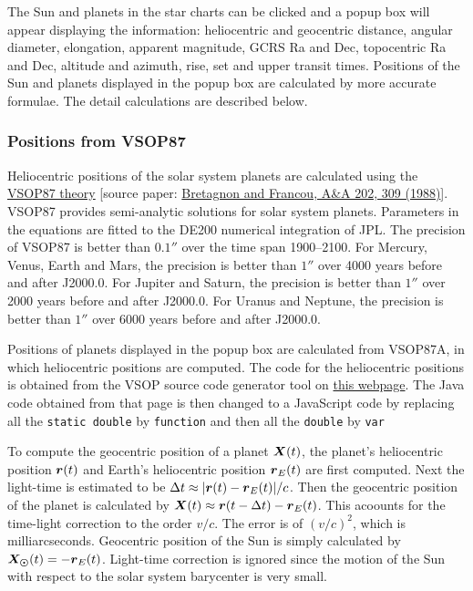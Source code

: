\documentclass[12pt]{article}
\newcommand{\ve}[1]{\mbox{\boldmath $#1$}}
\begin{document}
The Sun and planets in the star charts can be clicked and a popup box 
will appear displaying the information: heliocentric and geocentric distance, 
angular diameter, elongation, apparent magnitude, GCRS Ra and Dec, 
topocentric Ra and Dec, altitude and azimuth, rise, set and upper transit times. 
Positions of the Sun and planets displayed in the popup box are calculated by more 
accurate formulae. The detail calculations are described below.

\subsubsection{Positions from VSOP87} 

Heliocentric positions of the solar system planets are calculated using the 
\href{http://neoprogrammics.com/vsop87/}{VSOP87 theory} [source
paper: \href{https://ui.adsabs.harvard.edu/#abs/1988A&A...202..309B/abstract}
{Bretagnon and Francou, A\&A 202, 309 (1988)}]. VSOP87 provides semi-analytic 
solutions for solar system planets. Parameters in the equations are fitted to the 
DE200 numerical integration of JPL. The precision of VSOP87 is better than $0.1''$ 
over the time span 1900--2100. For Mercury, Venus, Earth and Mars, the 
precision is better than $1''$ over 4000 years before and after 
J2000.0. For Jupiter and Saturn, the precision is better than $1''$ over 2000 years 
before and after J2000.0. For Uranus and Neptune, the precision is better than 
$1''$ over 6000 years before and after J2000.0. 

Positions of planets displayed in the popup box are calculated from 
VSOP87A, in which heliocentric positions are computed. The code 
for the heliocentric positions is obtained from the VSOP source 
code generator tool on 
\href{http://neoprogrammics.com/vsop87/source_code_generator_tool/index.php}{this webpage}. 
The Java code obtained from that page is then changed to a JavaScript code by 
replacing all the {\tt static double} by {\tt function} and then all the 
{\tt double} by {\tt var} 

To compute the geocentric position of a planet $\ve{X}(t)$, the planet's heliocentric 
position $\ve{r}(t)$ and Earth's heliocentric position $\ve{r}_E(t)$ are first computed. 
Next the light-time is estimated to be $\Delta t \approx |\ve{r}(t)-\ve{r}_E(t)|/c$. 
Then the geocentric position of the planet is calculated by $\ve{X}(t) \approx
\ve{r}(t-\Delta t) - \ve{r}_E(t)$. This acoounts for the time-light correction to the order 
$v/c$. The error is of $(v/c)^2$, which is milliarcseconds. Geocentric 
position of the Sun is simply calculated by $\ve{X_{\odot}}(t)=-\ve{r}_E(t)$. Light-time 
correction is ignored since the motion of the Sun with respect to the solar system 
barycenter is very small.
\end{document}
